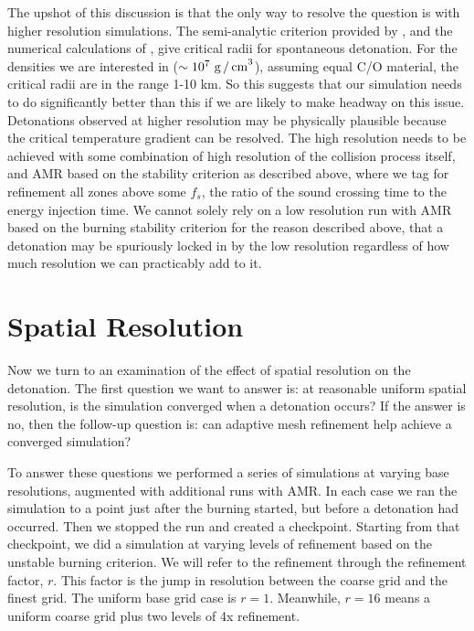 \documentclass[twocolumn,numberedappendix]{../aastex6}
\begin{document}
The upshot of this discussion is that the only way to resolve the
question is with higher resolution simulations. The semi-analytic
criterion provided by \cite{garg:2017}, and the numerical calculations
of \cite{seitenzahl:2009}, give critical radii for spontaneous detonation.
For the densities we are interested in ($\sim 10^7\ \text{g\,/\,cm}^3$),
assuming equal C/O material, the critical radii are in the range 1-10 km.
So this suggests that our simulation needs to do significantly better than
this if we are likely to make headway on this issue. Detonations observed
at higher resolution may be physically plausible because the critical
temperature gradient can be resolved. The high resolution needs to be
achieved with some combination of high resolution of the collision process
itself, and AMR based on the stability criterion as described
above, where we tag for refinement all zones above some $f_{s}$, the
ratio of the sound crossing time to the energy injection time. We
cannot solely rely on a low resolution run with AMR based on the
burning stability criterion for the reason described above, that a
detonation may be spuriously locked in by the low resolution regardless
of how much resolution we can practicably add to it.



\section{Spatial Resolution}
\label{sec:spatialresolution}

Now we turn to an examination of the effect of spatial resolution on the detonation.
The first question we want to answer is: at reasonable uniform spatial resolution, is
the simulation converged when a detonation occurs? If the answer is no, then the
follow-up question is: can adaptive mesh refinement help achieve a converged simulation?

To answer these questions we performed a series of simulations at varying base
resolutions, augmented with additional runs with AMR. In each case we ran the
simulation to a point just after the burning started, but before a detonation
had occurred. Then we stopped
the run and created a checkpoint. Starting from that checkpoint, we did a simulation
at varying levels of refinement based on the unstable burning criterion. We will refer
to the refinement through the refinement factor, $r$. This factor is the jump in
resolution between the coarse grid and the finest grid. The uniform base grid case is $r = 1$.
Meanwhile, $r = 16$ means a uniform coarse grid plus two levels of 4x refinement.
\end{document}
